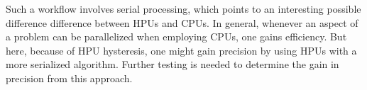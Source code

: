 \documentclass[letterpaper]{article}
\begin{document}
Such a workflow involves serial processing, which points to an interesting  
possible difference difference between HPUs and CPUs.  In general, whenever 
an aspect 
of a problem can be parallelized when employing CPUs, one gains efficiency.  
But here, because of HPU hysteresis, one might gain precision by using HPUs 
with a more serialized algorithm. Further
testing is needed to determine the gain in precision from this approach.

 

\begin{figure}
\end{figure}
\end{document}
